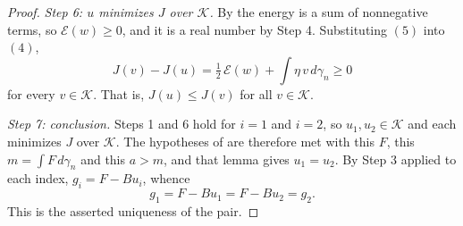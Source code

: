\begin{proof}
\emph{Step 6: $u$ minimizes $J$ over $\mathcal{K}$.}
By  the energy is a sum of nonnegative terms, so
$\mathcal{E}(w) \geq 0$, and it is a real number by Step 4.  Substituting $(5)$
into $(4)$,
\[
  J(v) - J(u) = \tfrac12\,\mathcal{E}(w) + \int \eta\,v \, d\gamma_n \geq 0
\]
for every $v \in \mathcal{K}$.  That is, $J(u) \leq J(v)$ for all
$v \in \mathcal{K}$.

\emph{Step 7: conclusion.}
Steps 1 and 6 hold for $i = 1$ and $i = 2$, so $u_1, u_2 \in \mathcal{K}$ and
each minimizes $J$ over $\mathcal{K}$.  The hypotheses of
 are therefore met with this $F$, this
$m = \int F \, d\gamma_n$ and this $a > m$, and that lemma gives $u_1 = u_2$.
By Step 3 applied to each index, $g_i = F - B u_i$, whence
\[
  g_1 = F - Bu_1 = F - Bu_2 = g_2 .
\]
This is the asserted uniqueness of the pair.
\end{proof}
